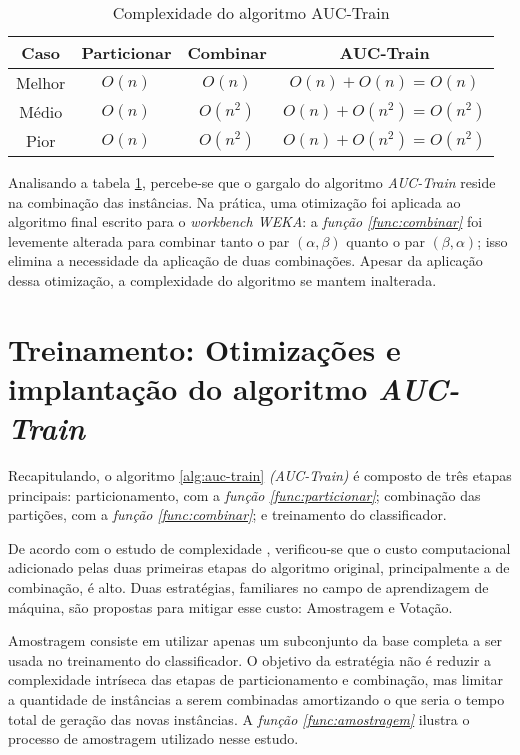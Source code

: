 \begin{table}[h!]
    \centering
    \begin{tabular}{ c | c c | c }
        \hline

        Caso & Particionar & Combinar & AUC-Train \\

        \hline

        Melhor & $O(n)$ & $O(n)$ & $O(n) + O(n) = O(n)$ \\
        Médio & $O(n)$ & $O(n^2)$ & $O(n) + O(n^2) = O(n^2)$ \\
        Pior  & $O(n)$ & $O(n^2)$ & $O(n) + O(n^2) = O(n^2)$ \\

        \hline
    \end{tabular}

    \caption{Complexidade do algoritmo AUC-Train}
    \label{auc-train-complexity}
\end{table}

Analisando a tabela \ref{auc-train-complexity}, percebe-se que o gargalo do algoritmo \emph{AUC-Train} reside na combinação das instâncias. Na prática, uma otimização foi aplicada ao algoritmo final escrito para o \emph{workbench WEKA}: a \emph{função \ref{func:combinar}} foi levemente alterada para combinar tanto o par $(\alpha, \beta)$ quanto o par $(\beta, \alpha)$; isso elimina a necessidade da aplicação de duas combinações. Apesar da aplicação dessa otimização, a complexidade do algoritmo se mantem inalterada.


\section{Treinamento: Otimizações e implantação do algoritmo \emph{AUC-Train}}

Recapitulando, o algoritmo \ref{alg:auc-train} \emph{(AUC-Train)} é composto de três etapas principais: particionamento, com a \emph{função \ref{func:particionar}}; combinação das partições, com a \emph{função \ref{func:combinar}}; e treinamento do classificador.

De acordo com o estudo de complexidade , verificou-se que o custo computacional adicionado pelas duas primeiras etapas do algoritmo  original, principalmente a de combinação, é alto. Duas estratégias, familiares no campo de aprendizagem de máquina, são propostas para mitigar esse custo: Amostragem e Votação.

Amostragem consiste em utilizar apenas um subconjunto da base completa a ser usada no treinamento do classificador. O objetivo da estratégia não é reduzir a complexidade intríseca das etapas de particionamento e combinação, mas limitar a quantidade de instâncias a serem combinadas amortizando o que seria o tempo total de geração das novas instâncias. A \emph{função \ref{func:amostragem}} ilustra o processo de amostragem utilizado nesse estudo.

